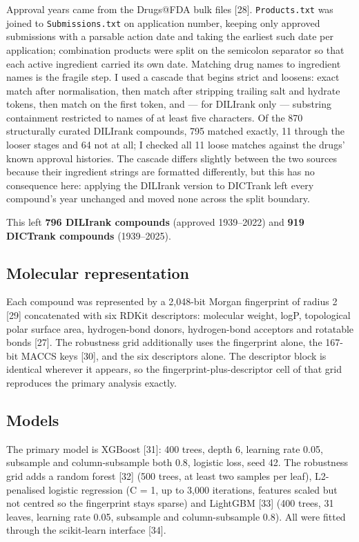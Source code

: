 Approval years came from the Drugs@FDA bulk files [28]. \texttt{Products.txt} was joined to \texttt{Submissions.txt} on application number, keeping only approved submissions with a parsable action date and taking the earliest such date per application; combination products were split on the semicolon separator so that each active ingredient carried its own date. Matching drug names to ingredient names is the fragile step. I used a cascade that begins strict and loosens: exact match after normalisation, then match after stripping trailing salt and hydrate tokens, then match on the first token, and --- for DILIrank only --- substring containment restricted to names of at least five characters. Of the 870 structurally curated DILIrank compounds, 795 matched exactly, 11 through the looser stages and 64 not at all; I checked all 11 loose matches against the drugs' known approval histories. The cascade differs slightly between the two sources because their ingredient strings are formatted differently, but this has no consequence here: applying the DILIrank version to DICTrank left every compound's year unchanged and moved none across the split boundary.

This left \textbf{796 DILIrank compounds} (approved 1939--2022) and \textbf{919 DICTrank compounds} (1939--2025).

\subsection{Molecular representation}

Each compound was represented by a 2,048-bit Morgan fingerprint of radius 2 [29] concatenated with six RDKit descriptors: molecular weight, logP, topological polar surface area, hydrogen-bond donors, hydrogen-bond acceptors and rotatable bonds [27]. The robustness grid additionally uses the fingerprint alone, the 167-bit MACCS keys [30], and the six descriptors alone. The descriptor block is identical wherever it appears, so the fingerprint-plus-descriptor cell of that grid reproduces the primary analysis exactly.

\subsection{Models}

The primary model is XGBoost [31]: 400 trees, depth 6, learning rate 0.05, subsample and column-subsample both 0.8, logistic loss, seed 42. The robustness grid adds a random forest [32] (500 trees, at least two samples per leaf), L2-penalised logistic regression (C = 1, up to 3,000 iterations, features scaled but not centred so the fingerprint stays sparse) and LightGBM [33] (400 trees, 31 leaves, learning rate 0.05, subsample and column-subsample 0.8). All were fitted through the scikit-learn interface [34].

